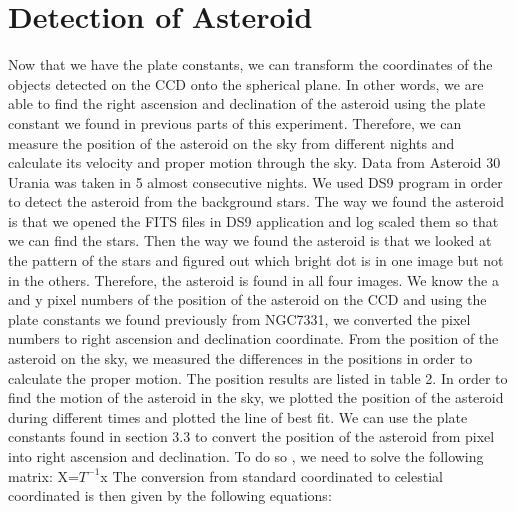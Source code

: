 \documentclass[letterpaper,12pt]{article}
\begin{document}
\begin{figure}[h!]
                                                                                                                                                                                                                                                                                                                                                                                                                                                                                                                                                                                                                                                                                                                                                                                                                                                                                                                                                                                                                                                                          \end{figure}    
   
   
   
\section{Detection of Asteroid}
\label{sec:detectionofasteroid}
Now that we have the plate constants, we can transform the coordinates of the objects detected on the CCD onto the spherical plane. In other words, we are able to find the right ascension and declination of the asteroid using the plate constant we found in previous parts of this experiment. Therefore, we can measure the position of the asteroid on the sky from different nights and calculate its velocity and proper motion through the sky. Data from Asteroid 30 Urania was taken in 5 almost consecutive nights. We used DS9 program in order to detect the asteroid from the background stars. The way we found the asteroid is that we opened the FITS files in DS9 application and log scaled them so that we can find the stars. Then the way we found the asteroid is that we looked at the pattern of the stars and figured out which bright dot is in one image but not in the others. Therefore, the asteroid is found in all four images. We know the a and y pixel numbers of the position of the asteroid on the CCD and using the plate constants we found previously from NGC7331, we converted the pixel numbers to right ascension and declination coordinate. From the position of the asteroid on the sky, we measured the differences in the positions in order to calculate the proper motion. The position results are listed in table 2.
In order to find the motion of the asteroid in the sky, we plotted the position of the asteroid during different times and plotted the line of best fit. We can use the plate constants found in section 3.3 to convert the position of the asteroid from pixel into right ascension and declination. To do so , we need to solve the following matrix:
X=\begin{math}T^{-1}\end{math}x
The conversion from standard coordinated to celestial coordinated is then given by the following equations:
\end{document}
